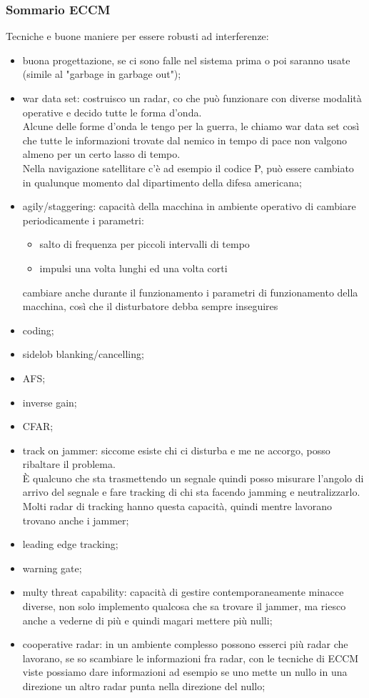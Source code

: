 \documentclass[oneside, 12pt]{extbook}
\begin{document}
\subsubsection{Sommario ECCM}
Tecniche e buone maniere per essere robusti ad interferenze:
\begin{itemize}
	\item buona progettazione, se ci sono falle nel sistema prima o poi saranno usate (simile al "garbage in garbage out");
	\item war data set: costruisco un radar, co che può funzionare con diverse modalità operative e decido tutte le forma d'onda.\\
	Alcune delle forme d'onda le tengo per la guerra, le chiamo war data set così che tutte le informazioni trovate dal nemico in tempo di pace non valgono almeno per un certo lasso di tempo.\\
	Nella navigazione satellitare c'è ad esempio il codice P, può essere cambiato in qualunque momento dal dipartimento della difesa americana;
	\item agily/staggering: capacità della macchina in ambiente operativo di cambiare periodicamente i parametri:
	\begin{itemize}
		\item salto di frequenza per piccoli intervalli di tempo
		\item impulsi una volta lunghi ed una volta corti
	\end{itemize}
	cambiare anche durante il funzionamento i parametri di funzionamento della macchina, così che il disturbatore debba sempre inseguires
	\item coding;
	\item sidelob blanking/cancelling;
	\item AFS;
	\item inverse gain;
	\item CFAR;
	\item track on jammer: siccome esiste chi ci disturba e me ne accorgo, posso ribaltare il problema.\\
	È qualcuno che sta trasmettendo un segnale quindi posso misurare l'angolo di arrivo del segnale e fare tracking di chi sta facendo jamming e neutralizzarlo.\\
	Molti radar di tracking hanno questa capacità, quindi mentre lavorano trovano anche i jammer;
	\item leading edge tracking;
	\item warning gate;
	\item multy threat capability: capacità di gestire contemporaneamente minacce diverse, non solo implemento qualcosa che sa trovare il jammer, ma riesco anche a vederne di più e quindi magari mettere più nulli;
	\item cooperative radar: in un ambiente complesso possono esserci più radar che lavorano, se so scambiare le informazioni fra radar, con le tecniche di ECCM viste possiamo dare informazioni ad esempio se uno mette un nullo in una direzione un altro radar punta nella direzione del nullo;
\end{itemize}
\end{document}
